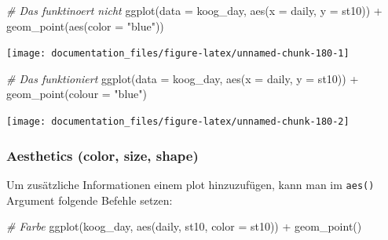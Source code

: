\documentclass[
]{article}
\newenvironment{Shaded}{\begin{snugshade}}{\end{snugshade}}
\newcommand{\AttributeTok}[1]{\textcolor[rgb]{0.77,0.63,0.00}{#1}}
\newcommand{\CommentTok}[1]{\textcolor[rgb]{0.56,0.35,0.01}{\textit{#1}}}
\newcommand{\FunctionTok}[1]{\textcolor[rgb]{0.00,0.00,0.00}{#1}}
\newcommand{\NormalTok}[1]{#1}
\newcommand{\SpecialCharTok}[1]{\textcolor[rgb]{0.00,0.00,0.00}{#1}}
\newcommand{\StringTok}[1]{\textcolor[rgb]{0.31,0.60,0.02}{#1}}
\begin{document}
\begin{Shaded}
\begin{Highlighting}[]
\CommentTok{\# Das funktinoert nicht}
\FunctionTok{ggplot}\NormalTok{(}\AttributeTok{data =}\NormalTok{ koog\_day, }\FunctionTok{aes}\NormalTok{(}\AttributeTok{x =}\NormalTok{ daily, }\AttributeTok{y =}\NormalTok{ st10)) }\SpecialCharTok{+}
  \FunctionTok{geom\_point}\NormalTok{(}\FunctionTok{aes}\NormalTok{(}\AttributeTok{color =} \StringTok{"blue"}\NormalTok{))}
\end{Highlighting}
\end{Shaded}

\begin{center}\texttt{[image: documentation\_files/figure-latex/unnamed-chunk-180-1]} \end{center}

\begin{Shaded}
\begin{Highlighting}[]
\CommentTok{\# Das funktioniert}
\FunctionTok{ggplot}\NormalTok{(}\AttributeTok{data =}\NormalTok{ koog\_day, }\FunctionTok{aes}\NormalTok{(}\AttributeTok{x =}\NormalTok{ daily, }\AttributeTok{y =}\NormalTok{ st10)) }\SpecialCharTok{+}
  \FunctionTok{geom\_point}\NormalTok{(}\AttributeTok{colour =} \StringTok{"blue"}\NormalTok{)}
\end{Highlighting}
\end{Shaded}

\begin{center}\texttt{[image: documentation\_files/figure-latex/unnamed-chunk-180-2]} \end{center}

\hypertarget{aesthetics-color-size-shape}{%
\subsubsection{Aesthetics (color, size, shape)}\label{aesthetics-color-size-shape}}

Um zusätzliche Informationen einem plot hinzuzufügen, kann man im \texttt{aes()} Argument folgende Befehle setzen:

\begin{Shaded}
\begin{Highlighting}[]
\CommentTok{\# Farbe}
\FunctionTok{ggplot}\NormalTok{(koog\_day, }\FunctionTok{aes}\NormalTok{(daily, st10, }\AttributeTok{color =}\NormalTok{ st10)) }\SpecialCharTok{+}
  \FunctionTok{geom\_point}\NormalTok{()}
\end{Highlighting}
\end{Shaded}
\end{document}
